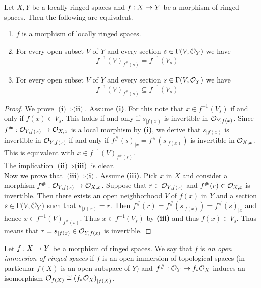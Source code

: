 \begin{fact}\label{fact:characterizationofmorphismsoflocallyringedspaces}
Let $X,Y$ be a locally ringed spaces and $f:X\rightarrow Y$ be a morphism of ringed spaces. Then the following are equivalent.
\begin{enumerate}[label=\emph{\textbf{(\roman*)}}, leftmargin=3.0em]
\item $f$ is a morphism of locally ringed spaces.
\item For every open subset $V$ of $Y$ and every section $s\in \Gamma(V,{\mathcal O}_Y)$ we have
$$f^{-1}\left(V\right)_{f^{\#}(s)} = f^{-1}(V_s)$$
\item For every open subset $V$ of $Y$ and every section $s\in \Gamma(V,{\mathcal O}_Y)$ we have
$$f^{-1}\left(V\right)_{f^{\#}(s)} \subseteq f^{-1}(V_s)$$
\end{enumerate}
\end{fact}
\begin{proof}
We prove $\textbf{(i)}\Rightarrow \textbf{(ii)}$. Assume \textbf{(i)}. For this note that $x\in f^{-1}(V_s)$ if and only if $f(x)\in V_s$. This holds if and only if $s_{\mid f(x)}$ is invertible in ${\mathcal O}_{Y,f(x)}$. Since $f^{\#}:{\mathcal O}_{Y,f(x)}\rightarrow {\mathcal O}_{X,x}$ is a local morphism by \textbf{(i)}, we derive that $s_{\mid f(x)}$ is invertible in ${\mathcal O}_{Y,f(x)}$ if and only if $f^{\#}(s)_{\mid x} = f^{\#}(s_{\mid f(x)})$ is invertible in ${\mathcal O}_{X,x}$. This is equivalent with $x\in f^{-1}(V)_{f^{\#}(s)}$.\\
The implication $\textbf{(ii)}\Rightarrow \textbf{(iii)}$ is clear.\\
Now we prove that $\textbf{(iii)}\Rightarrow \textbf{(i)}$. Assume \textbf{(iii)}. Pick $x$ in $X$ and consider a morphism $f^{\#}:{\mathcal O}_{Y,f(x)}\rightarrow {\mathcal O}_{X,x}$. Suppose that $r\in {\mathcal O}_{Y,f(x)}$ and $f^{\#}(r)\in {\mathcal O}_{X,x}$ is invertible. Then there exists an open neighborhood $V$ of $f(x)$ in $Y$ and a section $s\in \Gamma(V,{\mathcal O}_Y)$ such that $s_{\mid f(x)} = r$. Then $f^{\#}(r) = f^{\#}(s_{\mid f(x)}) = f^{\#}(s)_{\mid x}$ and hence $x\in f^{-1}(V)_{f^{\#}(s)}$. Thus $x\in f^{-1}(V_s)$ by \textbf{(iii)} and thus $f(x)\in V_s$. Thus means that $r = s_{\mid f(x)}\in {\mathcal O}_{Y,f(x)}$ is invertible.
\end{proof}

\begin{definition}
Let $f:X\rightarrow Y$ be a morphism of ringed spaces. We say that $f$ is \textit{an open immersion of ringed spaces} if $f$ is an open immersion of topological spaces (in particular $f(X)$ is an open subspace of $Y$) and $f^{\#}:{\mathcal O}_Y\rightarrow f_*{\mathcal O}_X$ induces an isomorphism ${\mathcal O}_{f(X)} \cong \left(f_*{\mathcal O}_X\right)_{\mid f(X)}$.
\end{definition}

